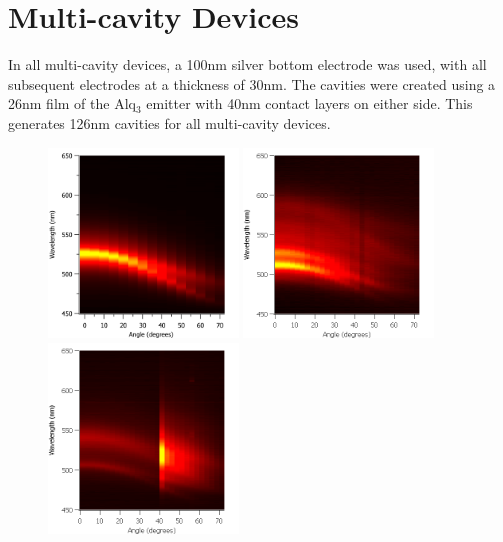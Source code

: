 \documentclass{report}
\begin{document}
    \section{Multi-cavity Devices}
        In all multi-cavity devices, a 100nm silver bottom electrode was used, with all subsequent electrodes at a thickness of 30nm. The cavities were created using a 26nm film of the Alq$_3$ emitter with 40nm contact layers on either side. This generates 126nm cavities for all multi-cavity devices.
		\begin{figure}[h]
            \centering
            \includegraphics[width=0.45\textwidth]{images/n2_heatmap.png}
            \includegraphics[width=0.45\textwidth]{images/n3_heatmap.png}
            \newline
            \includegraphics[width=0.45\textwidth]{images/n4_heatmap.png}

\end{figure}
\end{document}
